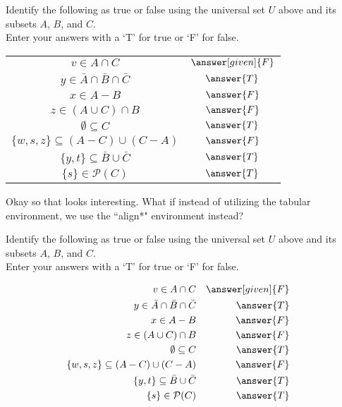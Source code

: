 \documentclass{ximera}
\begin{document}
\begin{question}
Identify the following as true or false using the universal set $U$ above and its subsets $A$, $B$, and $C$. \\ Enter your answers with a `T' for true or `F' for false.
\begin{prompt}
\begin{center}
    \begin{tabular}[c]{c c}

$v \in A \cap C$ & $\answer[given]{F}$ \\
			
$y \in \bar{A} \cap \bar{B} \cap \bar{C}$ & $\answer{T}$ \\
			
$x \in A - B$ & $\answer{F} $ \\
			
$z \in (A \cup C) \cap B$ & $\answer{F}$ \\
			
$\emptyset \subseteq C$ & $\answer{T}$\\
			
$\{w, s, z\} \subseteq (A - C) \cup (C - A)$ & $\answer{F}$ \\
$\{y,t\} \subseteq \bar{B} \cup \bar{C}$ & $\answer{T}$ \\
			
$\{s\} \in \mathcal{P}(C)$ & $\answer{T}$ \\
    \end{tabular}
   \end{center}
\end{prompt}
\end{question}

Okay so that looks interesting. What if instead of utilizing the tabular environment, we use the ``align*" environment instead?

\begin{question}
Identify the following as true or false using the universal set $U$ above and its subsets $A$, $B$, and $C$. \\ Enter your answers with a `T' for true or `F' for false.
\begin{prompt}

    \begin{align*}
        v \in A \cap C && \answer[given]{F}  \\
        y \in \bar{A} \cap \bar{B} \cap \bar{C} && \answer{T} \\		
        x \in A - B && \answer{F}  \\		
        z \in (A \cup C) \cap B && \answer{F} \\	
        \emptyset \subseteq C && \answer{T} \\	
        \{w, s, z\} \subseteq (A - C) \cup (C - A) && \answer{F}&\\
        \{y,t\} \subseteq \bar{B} \cup \bar{C} && \answer{T} \\			
        \{s\} \in \mathcal{P}(C) && \answer{T} 
    \end{align*}

\end{prompt}
\end{question}
\end{document}
